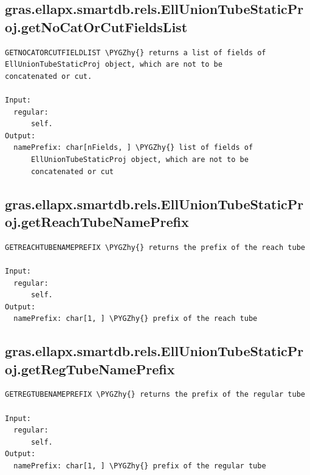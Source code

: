 \documentclass[letterpaper,10pt,english]{sphinxmanual}
\def\PYGZhy{\char`\-}
\begin{document}
\subsection{gras.ellapx.smartdb.rels.EllUnionTubeStaticProj.getNoCatOrCutFieldsList}
\label{chap_functions:gras-ellapx-smartdb-rels-elluniontubestaticproj-getnocatorcutfieldslist}
\begin{Verbatim}[commandchars=\\\{\}]
GETNOCATORCUTFIELDLIST \PYGZhy{} returns a list of fields of
EllUnionTubeStaticProj object, which are not to be
concatenated or cut.

Input:
  regular:
      self.
Output:
  namePrefix: char[nFields, ] \PYGZhy{} list of fields of
      EllUnionTubeStaticProj object, which are not to be
      concatenated or cut
\end{Verbatim}


\subsection{gras.ellapx.smartdb.rels.EllUnionTubeStaticProj.getReachTubeNamePrefix}
\label{chap_functions:gras-ellapx-smartdb-rels-elluniontubestaticproj-getreachtubenameprefix}
\begin{Verbatim}[commandchars=\\\{\}]
GETREACHTUBENAMEPREFIX \PYGZhy{} returns the prefix of the reach tube

Input:
  regular:
      self.
Output:
  namePrefix: char[1, ] \PYGZhy{} prefix of the reach tube
\end{Verbatim}


\subsection{gras.ellapx.smartdb.rels.EllUnionTubeStaticProj.getRegTubeNamePrefix}
\label{chap_functions:gras-ellapx-smartdb-rels-elluniontubestaticproj-getregtubenameprefix}
\begin{Verbatim}[commandchars=\\\{\}]
GETREGTUBENAMEPREFIX \PYGZhy{} returns the prefix of the regular tube

Input:
  regular:
      self.
Output:
  namePrefix: char[1, ] \PYGZhy{} prefix of the regular tube
\end{Verbatim}
\end{document}
